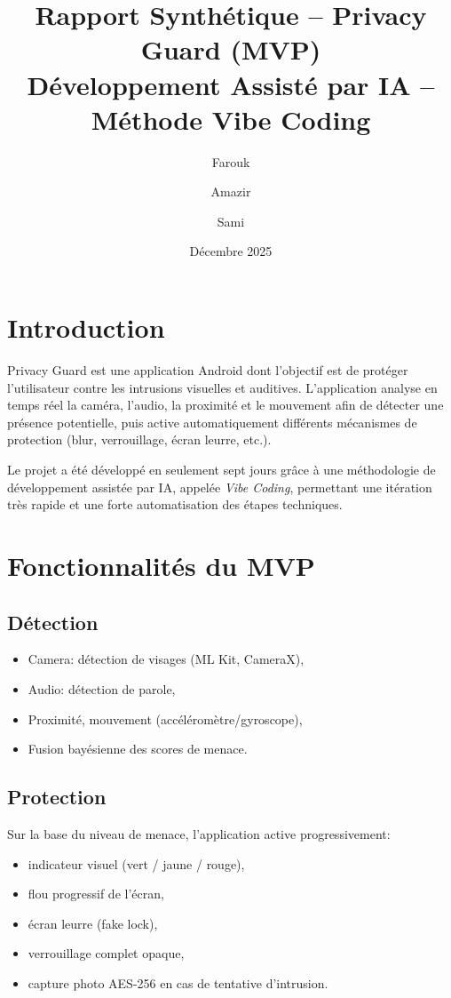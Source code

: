 \documentclass[11pt,a4paper]{article}
\title{\textbf{Rapport Synthétique -- Privacy Guard (MVP)}\\
\large Développement Assisté par IA -- Méthode Vibe Coding}
\author{Farouk \and Amazir \and Sami}
\date{Décembre 2025}
\begin{document}
\maketitle

\section{Introduction}

Privacy Guard est une application Android dont l'objectif est de protéger l'utilisateur contre les intrusions visuelles et auditives. 
L'application analyse en temps réel la caméra, l'audio, la proximité et le mouvement afin de détecter une présence potentielle, puis active automatiquement différents mécanismes de protection (blur, verrouillage, écran leurre, etc.). 

Le projet a été développé en seulement sept jours grâce à une méthodologie de développement assistée par IA, appelée \emph{Vibe Coding}, permettant une itération très rapide et une forte automatisation des étapes techniques.


\section{Fonctionnalités du MVP}

\subsection{Détection}
\begin{itemize}
    \item Camera: détection de visages (ML Kit, CameraX),
    \item Audio: détection de parole,
    \item Proximité, mouvement (accéléromètre/gyroscope),
    \item Fusion bayésienne des scores de menace.
\end{itemize}

\subsection{Protection}
Sur la base du niveau de menace, l'application active progressivement:
\begin{itemize}
    \item indicateur visuel (vert / jaune / rouge),
    \item flou progressif de l'écran,
    \item écran leurre (fake lock),
    \item verrouillage complet opaque,
    \item capture photo AES-256 en cas de tentative d'intrusion.
\end{itemize}
\end{document}
